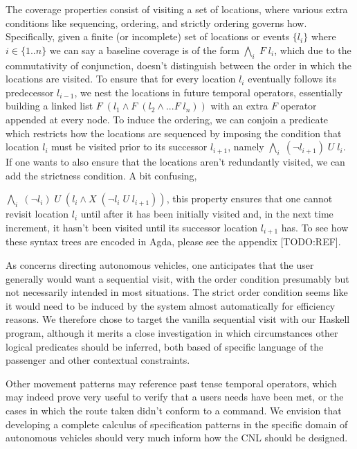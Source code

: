 \documentclass[a4paper, 11pt]{article}
\begin{document}
The coverage properties consist of visiting a set of locations, where various
extra conditions like sequencing, ordering, and strictly ordering governs how.
Specifically, given a finite (or incomplete) set of locations or events $\{l_i\}$
where $i \in \{1..n\}$ we can say a baseline coverage is of the form 
$\underset{i}{\bigwedge}\; F\; l_i$, which due to the commutativity of conjunction,
doesn't distinguish between the order in which the locations are visited. To
ensure that for every location $l_i$ eventually follows its predecessor $l_{i-1}$, we
nest the locations in future temporal operators, essentially building a linked
list $F\; (l_1 \wedge F\; (l_{2} \wedge ... F\; l_{n}))$ with an extra $F$
operator appended at every node. To induce the ordering, we can conjoin a predicate
which restricts how the locations are sequenced by imposing the condition that location
$l_{i}$ must be visited prior to its successor $l_{i+1}$, namely
$\underset{i}{\bigwedge}\; (\neg l_{i+1})\; U\; l_i$.
If one wants to also ensure that the locations aren't redundantly visited, we
can add the strictness condition. A bit confusing, 

$\underset{i}{\bigwedge}\; (\neg l_{i})\; U\; (l_i \wedge X\; (\neg l_i\; U\;
l_{i+1}))$, this property ensures that one cannot revisit location $l_i$ until
after it has been initially visited and, in the next time increment, it hasn't
been visited until its successor location $l_{i+1}$ has. To see how these syntax
trees are encoded in Agda, please see the appendix [TODO:REF]. 

As concerns directing autonomous vehicles, one anticipates that the user
generally would want a sequential visit, with the order condition presumably but
not necessarily intended in most situations. The strict order condition seems
like it would need to be induced by the system almost automatically for
efficiency reasons. We therefore chose to target the vanilla sequential visit
with our Haskell program, although it merits a close investigation in which
circumstances other logical predicates should be inferred, both based of
specific language of the passenger and other contextual constraints.

Other movement patterns may reference past tense temporal operators, which may
indeed prove very useful to verify that a users needs have been met, or the
cases in which the route taken didn't conform to a command. We envision that
developing a complete calculus of specification patterns in the specific domain
of autonomous vehicles should very much inform how the CNL should be designed.
\end{document}
